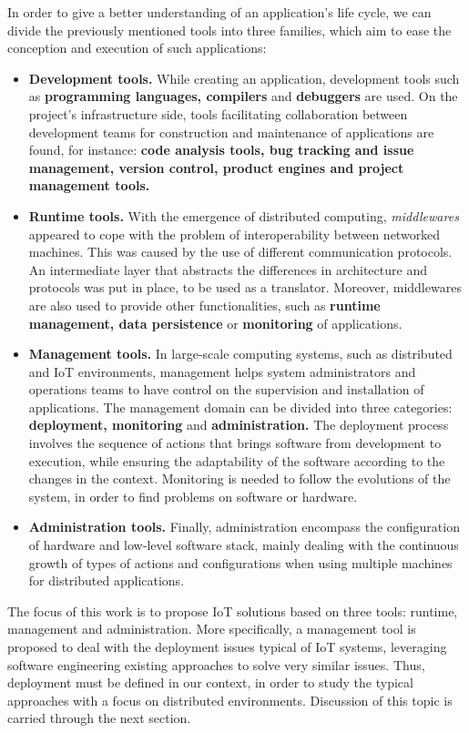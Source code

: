 In order to give a better understanding of an application's life cycle, we can divide the previously mentioned tools into three families, which aim to ease the conception and execution of such applications:
\begin{itemize}
	\item \textbf{Development tools.} While creating an application, development tools such as \textbf{programming languages, compilers} and \textbf{debuggers} are used. 
	On the project's infrastructure side, tools facilitating collaboration between development teams for construction and maintenance of applications are found, for instance: \textbf{code analysis tools, bug tracking and issue management, version control, product engines and project management tools.}
	\item \textbf{Runtime tools.} With the emergence of distributed computing, \textit{middlewares} appeared to cope with the problem of interoperability between networked machines.
	This was caused by the use of different communication protocols.
	An intermediate layer that abstracts the differences in architecture and protocols was put in place, to be used as a translator.
	Moreover, middlewares are also used to provide other functionalities, such as \textbf{runtime management, data persistence} or \textbf{monitoring} of applications.
	\item \textbf{Management tools.} In large-scale computing systems, such as distributed and IoT environments, management helps system administrators and operations teams to have control on the supervision and installation of applications.
	The management domain can be divided into three categories: \textbf{deployment, monitoring} and \textbf{administration.}
	The deployment process involves the sequence of actions that brings software from development to execution, while ensuring the adaptability of the software according to the changes in the context.
	Monitoring is needed to follow the evolutions of the system, in order to find problems on software or hardware.
	\item \textbf{Administration tools.} Finally, administration encompass the configuration of hardware and low-level software stack, mainly dealing with the continuous growth of types of actions and configurations when using multiple machines for distributed applications.
\end{itemize}

The focus of this work is to propose IoT solutions based on three tools: runtime, management and administration.
More specifically, a management tool is proposed to deal with the deployment issues typical of IoT systems, leveraging software engineering existing approaches to solve very similar issues.
Thus, deployment must be defined in our context, in order to study the typical approaches with a focus on distributed environments.
Discussion of this topic is carried through the next section.

